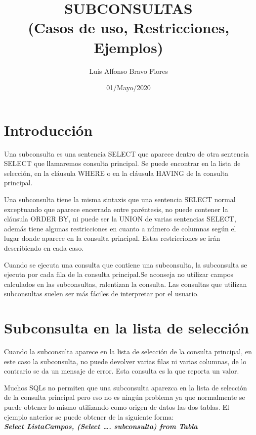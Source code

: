 \documentclass{article}
\title{SUBCONSULTAS \\(Casos de uso, Restricciones, Ejemplos)}
\author{Luis Alfonso Bravo Flores} %
\date{01/Mayo/2020}
\begin{document}
\maketitle

\section{Introducción}

Una subconsulta es una sentencia SELECT que aparece dentro de otra sentencia SELECT que llamaremos consulta principal. Se puede encontrar en la lista de selección, en la cláusula WHERE o en la cláusula HAVING de la consulta principal.

Una subconsulta tiene la misma sintaxis que una sentencia SELECT normal exceptuando que aparece encerrada entre paréntesis, no puede contener la cláusula ORDER BY, ni puede ser la UNION de varias sentencias SELECT, además tiene algunas restricciones en cuanto a número de columnas según el lugar donde aparece en la consulta principal. Estas restricciones se irán describiendo en cada caso.

Cuando se ejecuta una consulta que contiene una subconsulta, la subconsulta se ejecuta por cada fila de la consulta principal.Se aconseja no utilizar campos calculados en las subconsultas, ralentizan la consulta. Las consultas que utilizan subconsultas suelen ser más fáciles de interpretar por el usuario.

\section{Subconsulta en la lista de selección}

Cuando la subconsulta aparece en la lista de selección de la consulta principal, en este caso la subconsulta, no puede devolver varias filas ni varias columnas, de lo contrario se da un mensaje de error. Esta consulta es la que reporta un valor.

Muchos SQLs no permiten que una subconsulta aparezca en la lista de selección de la consulta principal pero eso no es ningún problema ya que normalmente se puede obtener lo mismo utilizando como origen de datos las dos tablas. El ejemplo anterior se puede obtener de la siguiente forma:\\


\textit{\textbf{Select ListaCampos, (Select …. subconsulta) from Tabla}}
\end{document}
